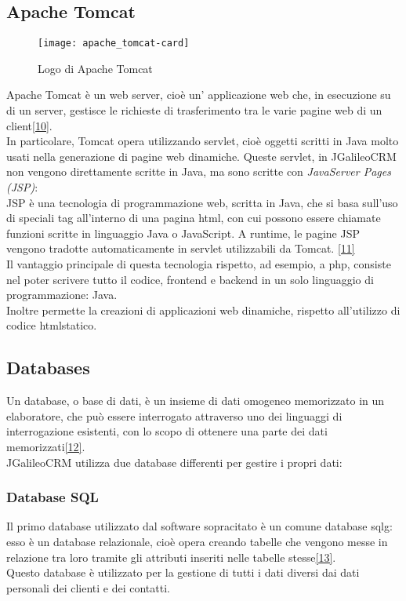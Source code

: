 \subsection{Apache Tomcat}
\begin{figure}[h]
	\centering
	\texttt{[image: apache\_tomcat-card]}
	\caption{Logo di Apache Tomcat}
\end{figure}
Apache Tomcat è un web server, cioè un' applicazione web che, in esecuzione su di un server, gestisce le richieste di trasferimento tra le varie pagine web di un client\hyperlink{10}{[10]}.\\
In particolare, Tomcat opera utilizzando \gls{servlet}\glsfirstoccur, cioè oggetti scritti in Java molto usati nella generazione di pagine web dinamiche.
Queste \gls{servlet}, in JGalileoCRM non vengono direttamente scritte in Java, ma sono scritte con \emph{JavaServer Pages (JSP)}:\\
JSP è una tecnologia di programmazione web, scritta in Java, che si basa sull'uso di speciali tag all'interno di una pagina \gls{html}, con cui possono essere chiamate funzioni scritte in linguaggio Java o JavaScript.
A runtime, le pagine JSP vengono tradotte automaticamente in \gls{servlet} utilizzabili da Tomcat. \hyperlink{11}{[11]}\\
Il vantaggio principale di questa tecnologia rispetto, ad esempio, a \gls{php}\glsfirstoccur, consiste nel poter scrivere tutto il codice, frontend e backend in un solo linguaggio di programmazione: Java. \\
Inoltre permette la creazioni di applicazioni web dinamiche, rispetto all'utilizzo di codice \gls{html}\glsfirstoccur statico.
\subsection{Databases}
Un database, o base di dati, è un insieme di dati omogeneo memorizzato in un elaboratore, che può essere interrogato attraverso uno dei linguaggi di interrogazione esistenti, con lo scopo di ottenere una parte dei dati memorizzati\hyperlink{12}{[12]}.\\
JGalileoCRM utilizza due database differenti per gestire i propri dati:
\subsubsection{Database SQL}
Il primo database utilizzato dal software sopracitato è un comune database \gls{sqlg}\glsfirstoccur: esso è un database relazionale, cioè opera creando tabelle che vengono messe in relazione tra loro tramite gli attributi inseriti nelle tabelle stesse\hyperlink{13}{[13]}.\\
Questo database è utilizzato per la gestione di tutti i dati diversi dai dati personali dei clienti e dei contatti. %
